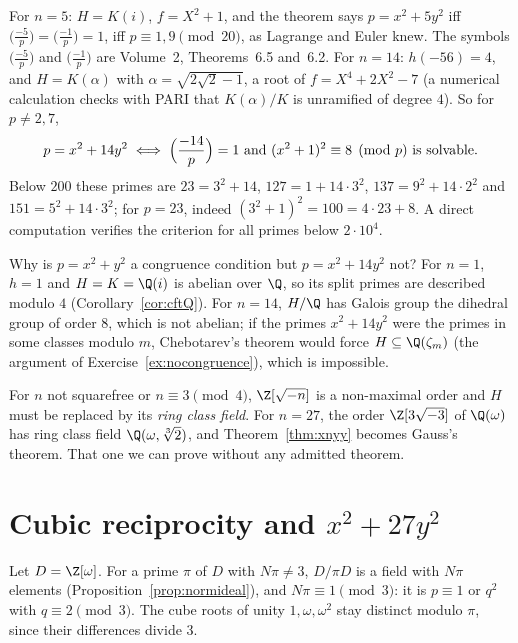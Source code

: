 \begin{example}\label{exa:n14}
For $n=5$: $H=K(i)$, $f=X^2+1$, and the theorem says $p=x^2+5y^2$ iff $\bigl(\frac{-5}p\bigr)=\bigl(\frac{-1}p\bigr)=1$, iff $p\equiv1,9\pmod{20}$, as
Lagrange and Euler knew. The symbols $\bigl(\frac{-5}p\bigr)$ and $\bigl(\frac{-1}p\bigr)$ are Volume~2, Theorems~6.5 and~6.2. For $n=14$: $h(-56)=4$, and $H=K(\alpha)$ with $\alpha=\sqrt{2\sqrt2-1}$, a root of $f=X^4+2X^2-7$ (a numerical calculation
checks with PARI that $K(\alpha)/K$ is unramified of degree $4$). So for $p\ne2,7$,
\[
p=x^2+14y^2\iff\Bigl(\frac{-14}p\Bigr)=1\text{ and }(x^2+1)^2\equiv8\pmod p\text{ is solvable}.
\]
Below $200$ these primes are $23=3^2+14$, $127=1+14\cdot3^2$, $137=9^2+14\cdot2^2$ and $151=5^2+14\cdot3^2$; for $p=23$, indeed
$(3^2+1)^2=100=4\cdot23+8$. A direct computation verifies the criterion for all primes below $2\cdot10^4$.
\end{example}

\begin{think}
Why is $p=x^2+y^2$ a congruence condition but $p=x^2+14y^2$ not? For $n=1$, $h=1$ and $H=K=\Q(i)$ is abelian over $\Q$, so its split primes are
described modulo $4$ (Corollary~\ref{cor:cftQ}). For $n=14$, $H/\Q$ has Galois group the dihedral group of order $8$, which is not abelian; if the
primes $x^2+14y^2$ were the primes in some classes modulo $m$, Chebotarev's theorem would force $H\subseteq\Q(\zeta_m)$ (the argument of
Exercise~\ref{ex:nocongruence}), which is impossible.
\end{think}

For $n$ not squarefree or $n\equiv3\pmod4$, $\Z[\sqrt{-n}]$ is a non-maximal order and $H$ must be replaced by its \emph{ring class field}. For
$n=27$, the order $\Z[3\sqrt{-3}]$ of $\Q(\omega)$ has ring class field $\Q(\omega,\sqrt[3]2)$, and Theorem~\ref{thm:xnyy} becomes Gauss's theorem.
That one we can prove without any admitted theorem.

\section{Cubic reciprocity and \texorpdfstring{$x^2+27y^2$}{x²+27y²}}

Let $D=\Z[\omega]$. For a prime $\pi$ of $D$ with $N\pi\ne3$, $D/\pi D$ is a field with $N\pi$ elements (Proposition~\ref{prop:normideal}), and $N\pi\equiv1
\pmod3$: it is $p\equiv1$ or $q^2$ with $q\equiv2\pmod3$. The cube roots of unity $1,\omega,\omega^2$ stay distinct modulo $\pi$, since their
differences divide $3$.

